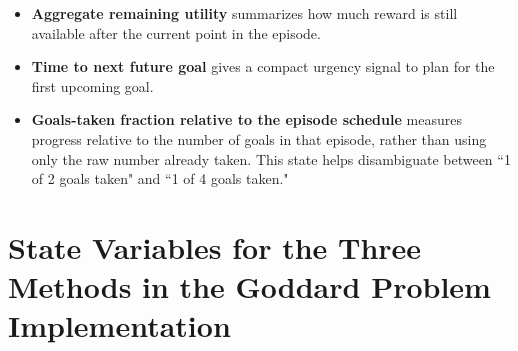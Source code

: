 \documentclass[mnsc,sglanonrev]{informs4}
\begin{document}
\begin{APPENDICES}
\begin{itemize}
  \item \textbf{Aggregate remaining utility} summarizes how much reward is still available after the current point in the episode.
  \item \textbf{Time to next future goal} gives a compact urgency signal to plan for the first upcoming goal.
  \item \textbf{Goals-taken fraction relative to the episode schedule} measures progress relative to the number of goals in that episode, rather than using only the raw number already taken. This state helps disambiguate between ``1 of 2 goals taken" and ``1 of 4 goals taken." 
\end{itemize}



\section{State Variables for the Three Methods in the Goddard Problem Implementation} \label{app:comparison_goddard}


\end{APPENDICES}
\end{document}
